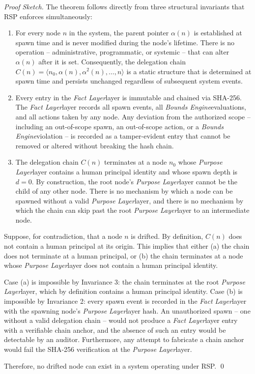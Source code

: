 \documentclass[12pt]{article}
\def\purpose{\textit{Purpose Layer}}
\def\bounds{\textit{Bounds Engine}}
\def\fact{\textit{Fact Layer}}
\begin{document}
\begin{proof}[Proof Sketch]
The theorem follows directly from three structural invariants that RSP enforces simultaneously:

\begin{enumerate}
    \item[\textbf{Invariance 1 -- Immutable parent pointer:}] For every node $n$ in the system, the parent pointer $\alpha(n)$ is established at spawn time and is never modified during the node's lifetime. There is no operation -- administrative, programmatic, or systemic -- that can alter $\alpha(n)$ after it is set. Consequently, the delegation chain $C(n) = \langle n_0, \alpha(n), \alpha^2(n), \ldots, n \rangle$ is a static structure that is determined at spawn time and persists unchanged regardless of subsequent system events.
    
    \item[\textbf{Invariance 2 -- Forensic ledger completeness:}] Every entry in the \fact layer is immutable and chained via SHA-256. The \fact layer records all spawn events, all \bounds evaluations, and all actions taken by any node. Any deviation from the authorized scope -- including an out-of-scope spawn, an out-of-scope action, or a \bounds violation -- is recorded as a tamper-evident entry that cannot be removed or altered without breaking the hash chain.
    
    \item[\textbf{Invariance 3 -- Chain terminates at the Purpose Layer:}] The delegation chain $C(n)$ terminates at a node $n_0$ whose \purpose layer contains a human principal identity and whose spawn depth is $d = 0$. By construction, the root node's \purpose layer cannot be the child of any other node. There is no mechanism by which a node can be spawned without a valid \purpose layer, and there is no mechanism by which the chain can skip past the root \purpose layer to an intermediate node.
\end{enumerate}

Suppose, for contradiction, that a node $n$ is drifted. By definition, $C(n)$ does not contain a human principal at its origin. This implies that either (a) the chain does not terminate at a human principal, or (b) the chain terminates at a node whose \purpose layer does not contain a human principal identity. 

Case (a) is impossible by Invariance 3: the chain terminates at the root \purpose layer, which by definition contains a human principal identity. Case (b) is impossible by Invariance 2: every spawn event is recorded in the \fact layer with the spawning node's \purpose layer hash. An unauthorized spawn -- one without a valid delegation chain -- would not produce a \fact layer entry with a verifiable chain anchor, and the absence of such an entry would be detectable by an auditor. Furthermore, any attempt to fabricate a chain anchor would fail the SHA-256 verification at the \purpose layer.

Therefore, no drifted node can exist in a system operating under RSP. \qed
\end{proof}
\end{document}
